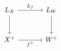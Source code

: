\[
\begin{tikzcd}[column sep=large,row sep=large]
  L_X
    \arrow[r,"L_f"]
    \arrow[d]
  &
  L_W
    \arrow[d]
  \\
  X^+
    \arrow[r,"f^+"']
  &
  W^+
\end{tikzcd}
\]
